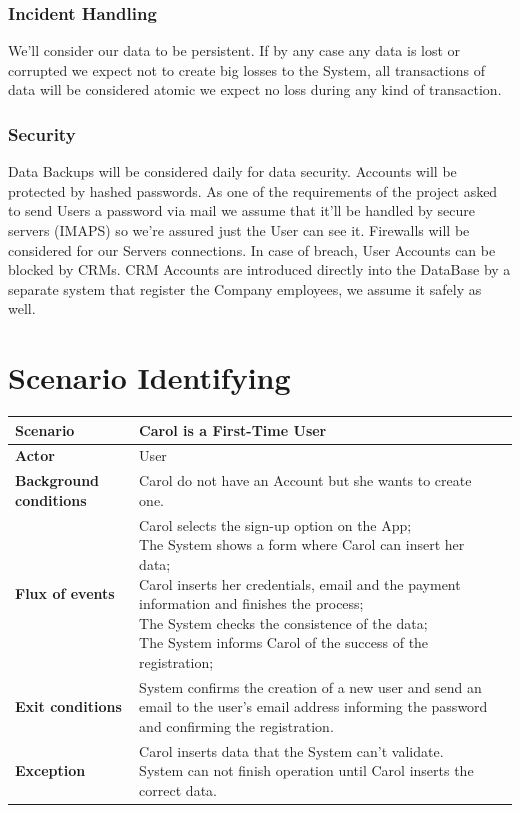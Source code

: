 \documentclass[a4paper]{article}
\begin{document}
\subsubsection{Incident Handling}
We'll consider our data to be persistent. If by any case any data is lost or corrupted we expect not to create big losses to the System, all transactions of data will be considered atomic we expect no loss during any kind of transaction. 

\subsubsection{Security}
Data Backups will be considered daily for data security. Accounts will be protected by hashed passwords. As one of the requirements of the project asked to send Users a password via mail we assume that it'll be handled by secure servers (IMAPS) so we're assured just the User can see it. Firewalls will be considered for our Servers connections. In case of breach, User Accounts can be blocked by CRMs. CRM Accounts are introduced directly into the DataBase by a separate system that register the Company employees, we assume it safely as well.

\section{Scenario Identifying}

\begin{tabular}{ |  l  |   l |  l  |  }
\hline
	\textbf { \textbf{Scenario}} & Carol is a First-Time User\\ \hline
	 \textbf{Actor}& User\\ \hline
	\textbf{Background conditions}&\parbox[t]{8cm}{Carol do not have an Account but she wants to create one. } \\ \hline
	\textbf{Flux of events} & \parbox[t]{8cm}{\textbullet  Carol selects the sign-up option on the App;\\\textbullet The System shows a form where Carol can insert her data;\\\textbullet Carol inserts her credentials, email and the payment information and finishes the process;\\\textbullet  The System checks the consistence of the data;\\\textbullet  The System informs Carol of the success of the registration;}\\ \hline
	\textbf{Exit conditions} &\parbox[t]{8cm}{ System confirms the creation of a new user and send an email to the user's email address informing the password and confirming the registration.}\\ \hline
	\textbf{Exception} & \parbox[t]{8cm}{Carol inserts data that the System can't validate. System can not finish operation until Carol inserts the correct data.   }\\ \hline
\end{tabular}
\newline
\end{document}
